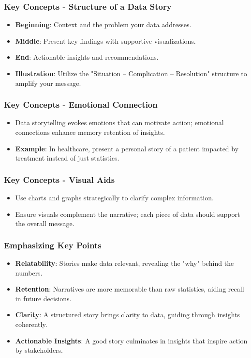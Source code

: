 \documentclass{beamer}
\begin{document}
\begin{frame}[fragile]
    \frametitle{Key Concepts - Structure of a Data Story}
    \begin{itemize}
        \item \textbf{Beginning}: Context and the problem your data addresses.
        \item \textbf{Middle}: Present key findings with supportive visualizations.
        \item \textbf{End}: Actionable insights and recommendations. \
        \item \textbf{Illustration}: Utilize the "Situation – Complication – Resolution" structure to amplify your message.
    \end{itemize}
\end{frame}

\begin{frame}[fragile]
    \frametitle{Key Concepts - Emotional Connection}
    \begin{itemize}
        \item Data storytelling evokes emotions that can motivate action; emotional connections enhance memory retention of insights.
        \item \textbf{Example}: In healthcare, present a personal story of a patient impacted by treatment instead of just statistics.
    \end{itemize}
\end{frame}

\begin{frame}[fragile]
    \frametitle{Key Concepts - Visual Aids}
    \begin{itemize}
        \item Use charts and graphs strategically to clarify complex information.
        \item Ensure visuals complement the narrative; each piece of data should support the overall message.
    \end{itemize}
\end{frame}

\begin{frame}[fragile]
    \frametitle{Emphasizing Key Points}
    \begin{itemize}
        \item \textbf{Relatability}: Stories make data relevant, revealing the "why" behind the numbers.
        \item \textbf{Retention}: Narratives are more memorable than raw statistics, aiding recall in future decisions.
        \item \textbf{Clarity}: A structured story brings clarity to data, guiding through insights coherently.
        \item \textbf{Actionable Insights}: A good story culminates in insights that inspire action by stakeholders.
    \end{itemize}
\end{frame}
\end{document}

